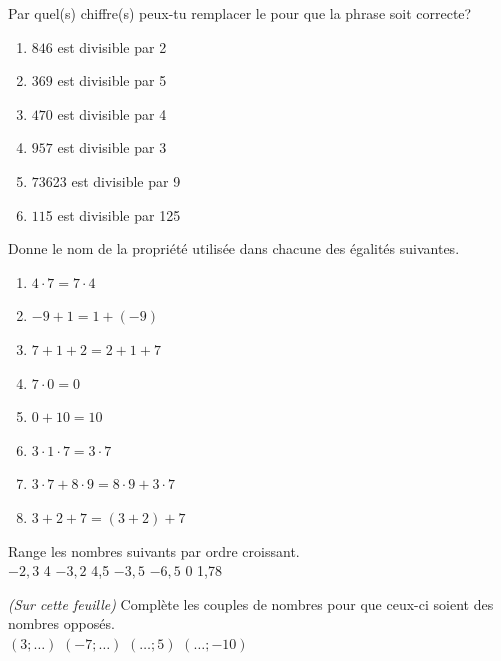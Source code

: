 \documentclass[10pt,a4paper]{article}
\begin{document}
\begin{exercise}
	Par quel(s) chiffre(s) peux-tu remplacer le  pour que la phrase soit correcte? 
	\begin{enumerate}[cols=3]
		\item \(84\)\(6\) est divisible par 2
		\item \(369\) est divisible par 5
		\item \(47\)\(0\) est divisible par 4
		\item \(95\)\(7\) est divisible par 3
		\item \(73\)623 est divisible par 9
		\item \(11\)5 est divisible par 125
	\end{enumerate}
\end{exercise}

\begin{exercise}
	Donne le nom de la propriété utilisée dans chacune des égalités suivantes. 
	\begin{enumerate}[cols=2]
		\item \(4 \cdot 7 = 7 \cdot 4 \)
		\item \(-9 + 1 = 1 + (-9)\)
		\item \(7 + 1 + 2 = 2 + 1 + 7 \)
		\item \(7 \cdot 0 = 0 \)
		\item \(0 + 10 = 10 \)
		\item \(3 \cdot 1 \cdot 7 = 3 \cdot 7\)
		\item \(3 \cdot 7 + 8 \cdot 9 = 8 \cdot 9 + 3 \cdot 7\)
		\item \(3 + 2 + 7 = (3 + 2) + 7\)
	\end{enumerate}
\end{exercise}

\begin{exercise}
	Range les nombres suivants par ordre croissant. \\
	\(-2,3\) \hfill 4 \hfill \(-3,2\) \hfill 4,5 \hfill \(-3,5\) \hfill \(-6,5\) \hfill 0 \hfill 1,78
\end{exercise}

\begin{exercise}
	\emph{(Sur cette feuille)} Complète les couples de nombres pour que ceux-ci soient des nombres opposés. \\

	\((3; \ldots )\) \hfill \((-7 ; \ldots )\) \hfill \((\ldots ; 5)\) \hfill \((\ldots ; -10)\)
\end{exercise}
\end{document}
